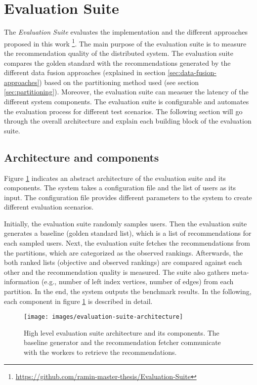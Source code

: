 \section{Evaluation Suite}
\label{sec:evaluation-suite}
The \emph{Evaluation Suite} evaluates the implementation and the different approaches proposed in this work \footnote{\url{https://github.com/ramin-master-thesis/Evaluation-Suite}}. The main purpose of the evaluation suite is to measure the recommendation quality of the distributed system. The evaluation suite compares the golden standard with the recommendations generated by the different data fusion approaches (explained in section \ref{sec:data-fusion-approaches}) based on the partitioning method used (see section \ref{sec:partitioning}). Moreover, the evaluation suite can measuer the latency of the different system components. The evaluation suite is configurable and automates the evaluation process for different test scenarios. The following section will go through the overall architecture and explain each building block of the evaluation suite.


\subsection{Architecture and components}
\label{sec:eval-suite-architecture-components}
Figure \ref{fig:evaluation-suite-architecture} indicates an abstract architecture of the evaluation suite and its components. The system takes a configuration file and the list of users as its input. The configuration file provides different parameters to the system to create different evaluation scenarios. 


Initially, the evaluation suite randomly samples users. Then the evaluation suite generates a baseline (golden standard list), which is a list of recommendations for each sampled users. Next, the evaluation suite fetches the recommendations from the partitions, which are categorized as the observed rankings. Afterwards, the both ranked lists (objective and observed rankings) are compared against each other and the recommendation quality is measured. The suite also gathers meta-information (e.g., number of left index vertices, number of edges) from each partition. In the end, the system outputs the benchmark results. In the following, each component in figure \ref{fig:evaluation-suite-architecture} is described in detail.


\begin{figure}[!htb]
    \centering
    \texttt{[image: images/evaluation-suite-architecture]}
    \caption{High level evaluation suite architecture and its components. The baseline generator and the recommendation fetcher communicate with the workers to retrieve the recommendations.}
    \label{fig:evaluation-suite-architecture}
\end{figure}


